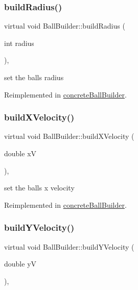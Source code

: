 \subsubsection{\texorpdfstring{build\+Radius()}{buildRadius()}}
{\footnotesize\ttfamily virtual void Ball\+Builder\+::build\+Radius (\begin{DoxyParamCaption}\item[{int}]{radius }\end{DoxyParamCaption})\hspace{0.3cm}{\ttfamily [inline]}, {\ttfamily [virtual]}}

set the ball\textquotesingle{}s radius 

Reimplemented in \mbox{\hyperlink{classconcrete_ball_builder_aa85cf84c6c3cf21e9e4ad83c250d0e58}{concrete\+Ball\+Builder}}.

\mbox{\label{class_ball_builder_a9139eedc191ad41fa221f06902646d4b}} 
\subsubsection{\texorpdfstring{build\+X\+Velocity()}{buildXVelocity()}}
{\footnotesize\ttfamily virtual void Ball\+Builder\+::build\+X\+Velocity (\begin{DoxyParamCaption}\item[{double}]{xV }\end{DoxyParamCaption})\hspace{0.3cm}{\ttfamily [inline]}, {\ttfamily [virtual]}}

set the ball\textquotesingle{}s x velocity 

Reimplemented in \mbox{\hyperlink{classconcrete_ball_builder_a45c8c4aaf54af6e5f619ccc3d0c62924}{concrete\+Ball\+Builder}}.

\mbox{\label{class_ball_builder_a1687bc4c363f259dd38b0d7d6ac92e57}} 
\subsubsection{\texorpdfstring{build\+Y\+Velocity()}{buildYVelocity()}}
{\footnotesize\ttfamily virtual void Ball\+Builder\+::build\+Y\+Velocity (\begin{DoxyParamCaption}\item[{double}]{yV }\end{DoxyParamCaption})\hspace{0.3cm}{\ttfamily [inline]}, {\ttfamily [virtual]}}

